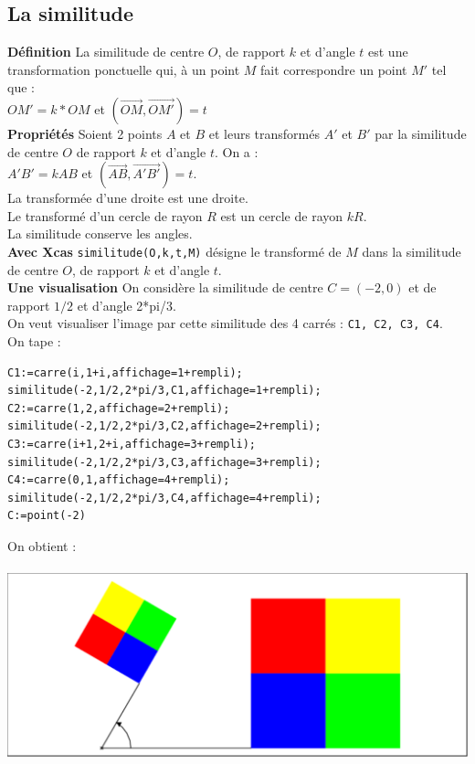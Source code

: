 \documentclass[a4paper,11pt]{book}
\begin{document}
\subsection{La similitude}
{\bf D\'efinition}
La similitude de centre $O$, de rapport $k$ et d'angle $t$ est une 
transformation ponctuelle qui, \`a un point $M$ fait correspondre un point $M'$
tel que :\\
$OM'=k*OM$ et $(\overrightarrow{OM},\overrightarrow{OM'})=t$\\
{\bf Propri\'et\'es}
Soient 2 points $A$ et $B$ et leurs transform\'es $A'$ et $B'$ par 
la similitude de centre $O$ de rapport $k$ et d'angle $t$.
On a :\\
$A'B'=kAB$ et $(\overrightarrow{AB},\overrightarrow{A'B'})=t$.\\
La transform\'ee d'une droite est une droite.\\
Le transform\'e d'un cercle de rayon $R$ est un cercle de rayon $kR$.\\
La similitude conserve les angles.\\

{\bf Avec Xcas}
{\tt similitude(O,k,t,M)} d\'esigne le transform\'e
de $M$ dans la similitude de centre $O$, de rapport $k$ et d'angle $t$.\\
{\bf Une visualisation}
On consid\`ere la similitude de centre $C=(-2,0)$ et de rapport $1/2$ et d'angle 2*pi/3.\\
On veut visualiser l'image par cette similitude des 4 carr\'es :
{\tt C1, C2, C3, C4}.\\
On tape :
\begin{verbatim}
C1:=carre(i,1+i,affichage=1+rempli);
similitude(-2,1/2,2*pi/3,C1,affichage=1+rempli);
C2:=carre(1,2,affichage=2+rempli);
similitude(-2,1/2,2*pi/3,C2,affichage=2+rempli);
C3:=carre(i+1,2+i,affichage=3+rempli);
similitude(-2,1/2,2*pi/3,C3,affichage=3+rempli);
C4:=carre(0,1,affichage=4+rempli);
similitude(-2,1/2,2*pi/3,C4,affichage=4+rempli);
C:=point(-2)
\end{verbatim}
On obtient :\\
\ \\
\includegraphics[width=\textwidth]{damiersimi1}
\end{document}
